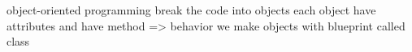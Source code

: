 object-oriented programming 
  break the code into objects 
  each object have attributes 
  and have method => behavior 
  we make objects with blueprint called class  